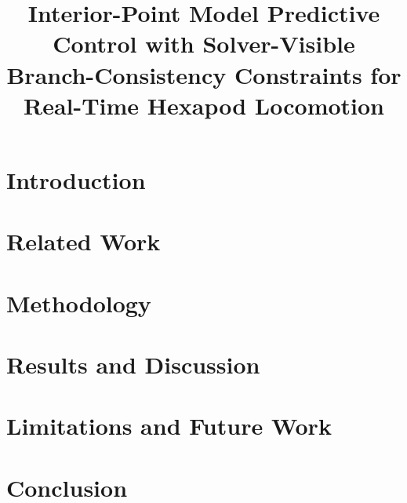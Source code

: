 \documentclass[conference]{IEEEtran}
\title{Interior-Point Model Predictive Control with Solver-Visible Branch-Consistency Constraints for Real-Time Hexapod Locomotion}
\author{
    \IEEEauthorblockN{Anonymous Authors}
    \IEEEauthorblockA{Anonymous Institution\\
    Email: anonymous@anonymous.edu}
}
\begin{document}
\maketitle

\begin{abstract}

\end{abstract}

\section{Introduction}


\section{Related Work}


\section{Methodology}


\section{Results and Discussion}


\section{Limitations and Future Work}


\section{Conclusion}




\end{document}
